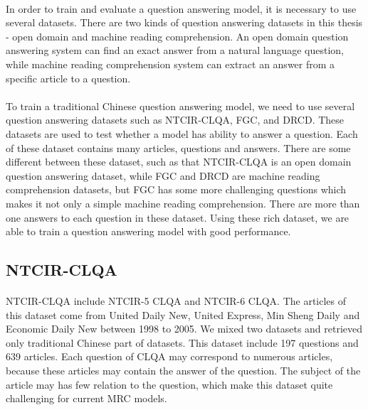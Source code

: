 \documentclass{article}
\begin{document}
\paragraph{}
In order to train and evaluate a question answering model, it is necessary to use several datasets. There are two kinds of question answering datasets in this thesis - open domain and machine reading comprehension. An open domain question answering system can find an exact answer from a natural language question, while machine reading comprehension system can extract an answer from a specific article to a question.
\paragraph{}
To train a traditional Chinese question answering model, we need to use several question answering datasets such as NTCIR-CLQA, FGC, and DRCD. These datasets are used to test whether a model has ability to answer a question. Each of these dataset contains many articles, questions and answers. There are some different between these dataset, such as that NTCIR-CLQA is an open domain question answering dataset, while FGC and DRCD are machine reading comprehension datasets, but FGC has some more challenging questions which makes it not only a simple machine reading comprehension. There are more than one answers to each question in these dataset. Using these rich dataset, we are able to train a question answering model with good performance.


\subsection{NTCIR-CLQA}
\paragraph{}
NTCIR-CLQA include NTCIR-5 CLQA\cite{sasaki2005ntcir5} and NTCIR-6\cite{sasaki2005ntcir6} CLQA. The articles of this dataset come from United Daily New, United Express, Min Sheng Daily and Economic Daily New between 1998 to 2005. We mixed two datasets and retrieved only traditional Chinese part of datasets. This dataset include 197 questions and 639 articles. Each question of CLQA may correspond to numerous articles, because these articles may contain the answer of the question. The subject of the article may has few relation to the question, which make this dataset quite challenging for current MRC models.
\end{document}
